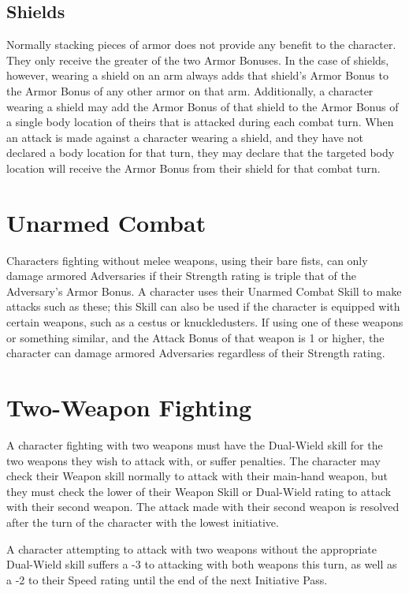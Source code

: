 \documentclass[oneside]{book}
\begin{document}
\begin{multicols}{2}
\subsection{Shields}
Normally stacking pieces of armor does not provide any benefit to the character. They only receive the greater of the two Armor Bonuses. In the case of shields, however, wearing a shield on an arm always adds that shield's Armor Bonus to the Armor Bonus of any other armor on that arm. Additionally, a character wearing a shield may add the Armor Bonus of that shield to the Armor Bonus of a single body location of theirs that is attacked during each combat turn. When an attack is made against a character wearing a shield, and they have not declared a body location for that turn, they may declare that the targeted body location will receive the Armor Bonus from their shield for that combat turn. 

\section{Unarmed Combat}
Characters fighting without melee weapons, using their bare fists, can only damage armored Adversaries if their Strength rating is triple that of the Adversary's Armor Bonus. A character uses their Unarmed Combat Skill to make attacks such as these; this Skill can also be used if the character is equipped with certain weapons, such as a cestus or knuckledusters. If using one of these weapons or something similar, and the Attack Bonus of that weapon is 1 or higher, the character can damage armored Adversaries regardless of their Strength rating.  

\section{Two-Weapon Fighting}
A character fighting with two weapons must have the Dual-Wield skill for the two weapons they wish to attack with, or suffer penalties. The character may check their Weapon skill normally to attack with their main-hand weapon, but they must check the lower of their Weapon Skill or Dual-Wield rating to attack with their second weapon. The attack made with their second weapon is resolved after the turn of the character with the lowest initiative. 

A character attempting to attack with two weapons without the appropriate Dual-Wield skill suffers a -3 to attacking with both weapons this turn, as well as a -2 to their Speed rating until the end of the next Initiative Pass. 


\end{multicols}
\end{document}

